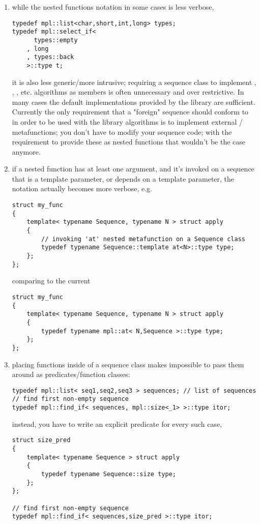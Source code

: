 \documentclass{netobjectdays}
\begin{document}
\begin{enumerate}
 \item while the nested functions notation in some cases is 
 less verbose, 

{\footnotesize
\begin{verbatim}
typedef mpl::list<char,short,int,long> types;
typedef mpl::select_if<
      types::empty
    , long
    , types::back
    >::type t;
\end{verbatim}
}

it is also less generic/more intrusive; requiring a sequence 
class to implement , , , etc. 
algorithms as members is often unnecessary and over restrictive. 
In many cases the default implementations provided by the library 
are sufficient.
Currently the only requirement that a "foreign" sequence should 
conform to in order to be used with the library algorithms is to 
implement external / metafunctions; you 
don't have to modify your sequence code; with the requirement to 
provide these as nested functions that wouldn't be the case anymore. 

\item if a nested function has at least one argument, and it's 
invoked on a sequence that is a template parameter, or depends 
on a template parameter, the notation actually becomes more 
verbose, e.g. 

{\footnotesize
\begin{verbatim}
struct my_func
{
    template< typename Sequence, typename N > struct apply
    {
        // invoking 'at' nested metafunction on a Sequence class
        typedef typename Sequence::template at<N>::type type;
    };
};
\end{verbatim}
}

comparing to the current 

{\footnotesize
\begin{verbatim}
struct my_func
{
    template< typename Sequence, typename N > struct apply
    {
        typedef typename mpl::at< N,Sequence >::type type;
    };
};
\end{verbatim}
}

\item placing functions inside of a sequence class makes 
impossible to pass them around as predicates/function classes: 

{\footnotesize
\begin{verbatim}
typedef mpl::list< seq1,seq2,seq3 > sequences; // list of sequences
// find first non-empty sequence
typedef mpl::find_if< sequences, mpl::size<_1> >::type itor;
\end{verbatim}
}

instead, you have to write an explicit predicate for every such case, 

{\footnotesize
\begin{verbatim}
struct size_pred
{
    template< typename Sequence > struct apply
    {
        typedef typename Sequence::size type;
    };
};

// find first non-empty sequence
typedef mpl::find_if< sequences,size_pred >::type itor;
\end{verbatim}
}

\end{enumerate}
\end{document}
